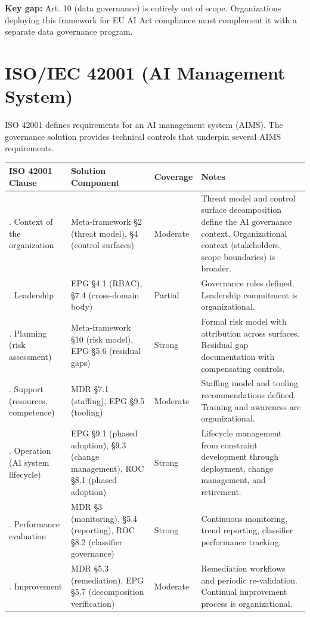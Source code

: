 \textbf{Key gap:} Art. 10 (data governance) is entirely out of scope. Organizations deploying this framework for EU AI Act compliance must complement it with a separate data governance program.



\section{ISO/IEC 42001 (AI Management System)}
\label{sec:regmap-3}


ISO 42001 defines requirements for an AI management system (AIMS). The governance solution provides technical controls that underpin several AIMS requirements.

\begin{table}[ht]
  \centering\small
  \begin{tabular}{@{}>{\raggedright\arraybackslash}p{1.68cm}>{\raggedright\arraybackslash}p{3.94cm}>{\raggedright\arraybackslash}p{1.09cm}>{\raggedright\arraybackslash}p{7.29cm}@{}}
  \toprule
  ISO 42001 Clause & Solution Component & Coverage & Notes \\
  \midrule
  4. Context of the organization & Meta-framework \S{}2 (threat model), \S{}4 (control surfaces) & Moderate & Threat model and control surface decomposition define the AI governance context. Organizational context (stakeholders, scope boundaries) is broader. \\
  5. Leadership & EPG \S{}4.1 (RBAC), \S{}7.4 (cross-domain body) & Partial & Governance roles defined. Leadership commitment is organizational. \\
  6. Planning (risk assessment) & Meta-framework \S{}10 (risk model), EPG \S{}5.6 (residual gaps) & Strong & Formal risk model with attribution across surfaces. Residual gap documentation with compensating controls. \\
  7. Support (resources, competence) & MDR \S{}7.1 (staffing), EPG \S{}9.5 (tooling) & Moderate & Staffing model and tooling recommendations defined. Training and awareness are organizational. \\
  8. Operation (AI system lifecycle) & EPG \S{}9.1 (phased adoption), \S{}9.3 (change management), ROC \S{}8.1 (phased adoption) & Strong & Lifecycle management from constraint development through deployment, change management, and retirement. \\
  9. Performance evaluation & MDR \S{}3 (monitoring), \S{}5.4 (reporting), ROC \S{}8.2 (classifier governance) & Strong & Continuous monitoring, trend reporting, classifier performance tracking. \\
  10. Improvement & MDR \S{}5.3 (remediation), EPG \S{}5.7 (decomposition verification) & Moderate & Remediation workflows and periodic re-validation. Continual improvement process is organizational. \\
  \bottomrule
  \end{tabular}
\end{table}




